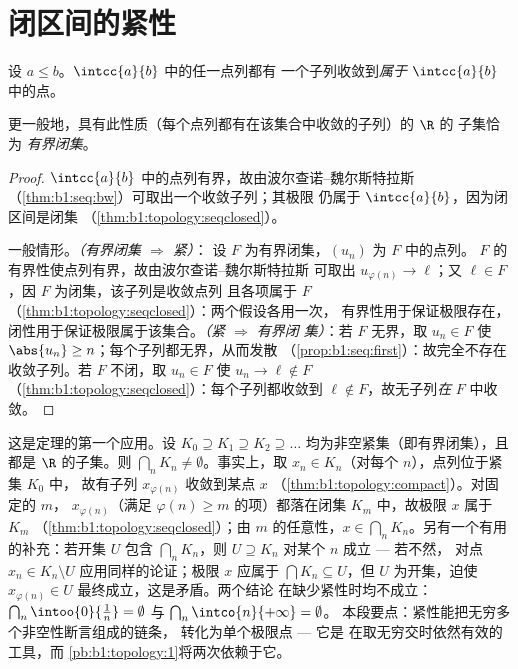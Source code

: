 \section{闭区间的紧性}

\begin{theorem}[闭区间是列紧的]\label{thm:b1:topology:compact}
设 $a \leq b$。$\intcc{a}{b}$ 中的任一点列都有
一个子列收敛到\emph{属于}
$\intcc{a}{b}$ 中的点。

更一般地，具有此性质（每个点列都有在该集合中收敛的子列）的 $\R$ 的
子集恰为
\emph{有界闭集}。
\end{theorem}

\begin{proof}
$\intcc{a}{b}$ 中的点列有界，故由波尔查诺--魏尔斯特拉斯
（\cref{thm:b1:seq:bw}）可取出一个收敛子列；其极限
仍属于 $\intcc{a}{b}$，因为闭区间是闭集
（\cref{thm:b1:topology:seqclosed}）。

一般情形。\emph{（有界闭集 $\Rightarrow$ 紧）}：
设 $F$ 为有界闭集，$(u_n)$ 为 $F$ 中的点列。
$F$ 的有界性使点列有界，故由波尔查诺--魏尔斯特拉斯
可取出 $u_{\varphi(n)} \to \ell$；又 $\ell \in F$，因 $F$
为闭集，该子列是收敛点列
且各项属于 $F$（\cref{thm:b1:topology:seqclosed}）：两个假设各用一次，
有界性用于保证极限存在，
闭性用于保证极限属于该集合。\emph{（紧 $\Rightarrow$ 有界闭
集）}：若 $F$ 无界，取 $u_n \in F$ 使 $\abs{u_n} \geq
n$；每个子列都无界，从而发散
（\cref{prop:b1:seq:first}）：故完全不存在收敛子列。若 $F$
不闭，取 $u_n \in F$ 使 $u_n \to \ell \notin F$
（\cref{thm:b1:topology:seqclosed}）：每个子列都收敛到
$\ell \notin F$，故无子列\emph{在} $F$ 中收敛。
\end{proof}

\begin{example}[嵌套紧集]\label{ex:b1:topology:nested}
这是定理的第一个应用。设 $K_0 \supseteq K_1 \supseteq
K_2 \supseteq \dots$ 均为非空紧集（即有界闭集），且都是
$\R$ 的子集。则 $\bigcap_n K_n \neq \emptyset$。事实上，取 $x_n
\in K_n$（对每个 $n$），点列位于紧集 $K_0$ 中，
故有子列 $x_{\varphi(n)}$ 收敛到某点 $x$
（\cref{thm:b1:topology:compact}）。对固定的 $m$，
$x_{\varphi(n)}$（满足 $\varphi(n) \geq m$ 的项）都落在闭集
$K_m$ 中，故极限 $x$ 属于 $K_m$
（\cref{thm:b1:topology:seqclosed}）；由 $m$ 的任意性，$x \in
\bigcap_n K_n$。另有一个有用的补充：若开集 $U$ 包含
$\bigcap_n K_n$，则 $U \supseteq K_n$ 对某个 $n$ 成立 --- 若不然，
对点 $x_n \in K_n \setminus U$ 应用同样的论证；极限
$x$ 应属于 $\bigcap K_n \subseteq U$，但 $U$ 为开集，迫使
$x_{\varphi(n)} \in U$ 最终成立，这是矛盾。两个结论
在缺少紧性时均不成立：$\bigcap_n \intoo{0}{\frac
1n} = \emptyset$ 与 $\bigcap_n \intco{n}{+\infty} = \emptyset$。
本段要点：紧性能把无穷多个非空性断言组成的链条，
转化为单个极限点 --- 它是
在取无穷交时依然有效的工具，而
\cref{pb:b1:topology:1}将两次依赖于它。
\end{example}

